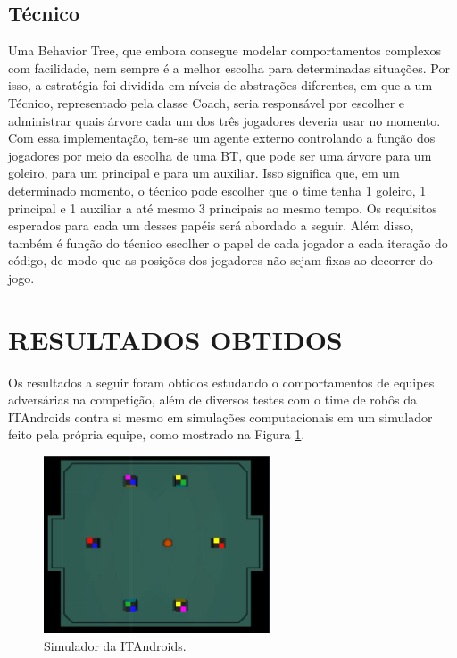 \documentclass[10pt,fleqn,a4paper]{article}
\begin{document}
\subsection{Técnico}

Uma Behavior Tree, que embora consegue modelar comportamentos complexos com facilidade, nem sempre é a melhor escolha para determinadas situações. Por isso, a estratégia foi dividida em níveis de abstrações diferentes, em que a um Técnico, representado pela classe Coach, seria responsável por escolher e administrar quais árvore cada um dos três jogadores deveria usar no momento.
Com essa implementação, tem-se um agente externo controlando a função dos jogadores por meio da escolha de uma BT, que pode ser uma árvore para um goleiro, para um principal e para um auxiliar. Isso significa que, em um determinado momento, o técnico pode escolher que o time tenha 1 goleiro, 1 principal e 1 auxiliar a até mesmo 3 principais ao mesmo tempo. Os requisitos esperados para cada um desses papéis será abordado a seguir. Além disso, também é função do técnico escolher o papel de cada jogador a cada iteração do código, de modo que as posições dos jogadores não sejam fixas ao decorrer do jogo.

    \section{RESULTADOS OBTIDOS}
        
	Os resultados a seguir foram obtidos estudando o comportamentos de equipes adversárias na competição, além de diversos testes com o time de robôs da ITAndroids contra si mesmo em simulações computacionais em um simulador feito pela própria equipe, como mostrado na Figura \ref{fig:simulator}.

\begin{figure}[H]
	\centering
	\includegraphics[width=0.6\textwidth]{figures/SimulatorWithoutButtons.png}
	\caption{Simulador da ITAndroids.}
	\label{fig:simulator}
\end{figure}
\end{document}
